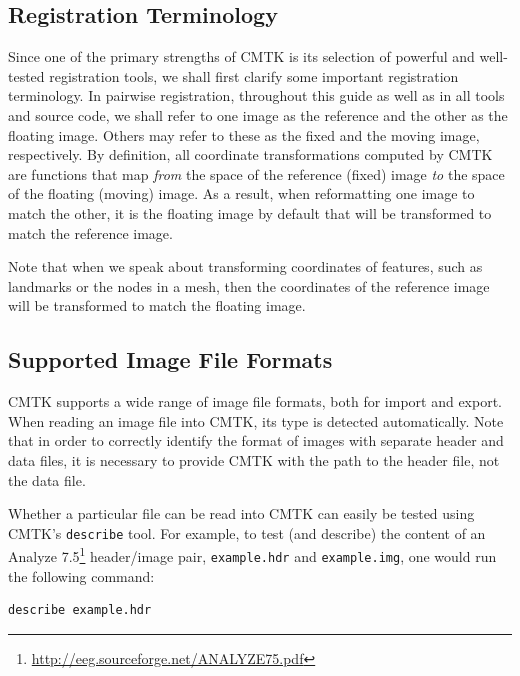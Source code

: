 \documentclass{InsightArticle}
\begin{document}
\subsection{Registration Terminology}

Since one of the primary strengths of CMTK is its selection of powerful and
well-tested registration tools, we shall first clarify some important
registration terminology.  In pairwise
registration,  throughout this guide as well as
in all tools and source code, we shall refer to one image as the reference
 and the other as the floating
image.  Others may refer to these as the fixed
 and the moving image, 
respectively. By definition, all coordinate transformations computed by CMTK
are functions that map {\em from\/} the space of the reference (fixed) image
{\em to\/} the space of the floating (moving) image. As a result, when
reformatting one image to match the other, it is the floating image by default
that will be transformed to match the reference image.

Note that when we speak about transforming coordinates of features, such as
landmarks or the nodes in a mesh, then the coordinates of the reference image
will be transformed to match the floating image.

\subsection{Supported Image File Formats}

CMTK supports a wide range of image file formats, both for import and
export. When reading an image file into CMTK, its type is detected
automatically. Note that in order to correctly identify the format of images
with separate header and data files, it is necessary to provide CMTK with the
path to the header file, not the data file.

Whether a particular file can be read into CMTK can easily be tested using
CMTK's \verb|describe| tool. For example, to test (and describe) the content
of an Analyze 7.5\footnote{\url{http://eeg.sourceforge.net/ANALYZE75.pdf}}
header/image pair, \verb|example.hdr| and \verb|example.img|, one would run
the following command:
\begin{verbatim}
describe example.hdr
\end{verbatim}
\end{document}
